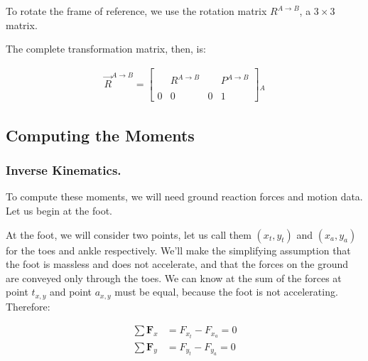 To rotate the frame of reference, we use the rotation matrix $R^{A\rightarrow B}$, a $3\times 3$ matrix. 


The complete transformation matrix, then, is: 

\begin{align}
\Vec{R}^{A\rightarrow B} =
\begin{bmatrix}
     & & & \\
     & R^{A\rightarrow B} & & P^{A\rightarrow B}\\
     & & & \\
     0 & 0 & 0 & 1 
\end{bmatrix}
{}_A
\end{align}

\subsection{Computing the Moments}

\subsubsection{Inverse Kinematics.}

To compute these moments, we will need ground reaction forces and motion data. Let us begin at the foot.\newline

At the foot, we will consider two points, let us call them $(x_t,y_t)$ and $(x_a,y_a)$ for the toes and ankle respectively. We'll make the simplifying assumption that the foot is massless and does not accelerate, and that the forces on the ground are conveyed only through the toes. We can know at the sum of the forces at point $t_{x,y}$ and point $a_{x,y}$ must be equal, because the foot is not accelerating. Therefore: 

\begin{equation}
\begin{split}
    \sum \mathbf{F}_x &= F_{x_t} - F_{x_a} = 0 \\
    \sum \mathbf{F}_y &= F_{y_t} - F_{y_a} = 0 
\end{split}
\end{equation}

